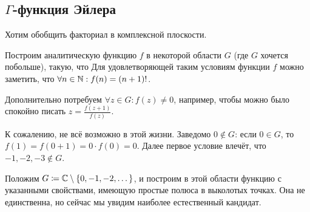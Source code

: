 \documentclass[a4paper]{report}
\begin{document}
    \subsection{$\Gamma$-функция Эйлера}
    \label{gamma}
    Хотим обобщить факториал в комплексной плоскости.

    Построим аналитическую функцию $f$ в некоторой области $G$ (где $G$ хочется побольше), такую, что
    Для удовлетворяющей таким условиям функции $f$ можно заметить, что $\forall n \in \mathbb{N}: f(n) = (n + 1)!$.

    Дополнительно потребуем $\forall z \in G: f(z) \ne 0$, например, чтобы можно было спокойно писать $z = \frac{f(z + 1)}{f(z)}$.

    К сожалению, не всё возможно в этой жизни.
    Заведомо $0 \notin G$: если $0 \in G$, то $f(1) = f(0 + 1) = 0 \cdot f(0) = 0$.
    Далее первое условие влечёт, что $-1, -2, -3 \notin G$.

    Положим $G \coloneqq \mathbb{C} \setminus \{0, -1, -2, \dots\}$, и построим в этой области функцию с указанными свойствами, имеющую простые полюса в выколотых точках.
    Она не единственна, но сейчас мы увидим наиболее естественный кандидат.
\end{document}
